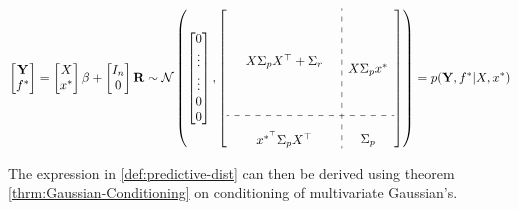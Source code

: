 \begin{gather}
    \begin{bmatrix}
        \mathbf{Y} \\
        f^{\ast}
    \end{bmatrix}
    = \begin{bmatrix} X \\ x^{\ast} \end{bmatrix} \beta + \begin{bmatrix} I_n \\ 0 \end{bmatrix}  \mathbf{R}
    \sim \N \left(
        \begin{bmatrix}
        0 \\
        \vdots \\
        \vdots \\
        0 \\
        0
        \end{bmatrix},
        \left[
        \begin{array}{ c:c c c }
            \begin{matrix}
                & & \\
                & & \\
                & & \\
                & X \Sigma_p X^{\top} + \Sigma_r & \\
                & & \\
                & & \\
                & & \\
            \end{matrix}
            & \begin{matrix} \\ \\ \\ X \Sigma_p x^{\ast} \\ \\ \\ \end{matrix} \\
            \hdashline \\
            \begin{matrix} &  x^{\ast^{\top}}  \Sigma_p X^{\top} & \end{matrix} & \Sigma_p
        \end{array}
        \right]
        \right)
    = p(\mathbf{Y}, f^{\ast}| X, x^{\ast})
\end{gather}

The expression in \ref{def:predictive-dist} can then be derived using theorem \ref{thrm:Gaussian-Conditioning} on
conditioning of multivariate Gaussian's.

